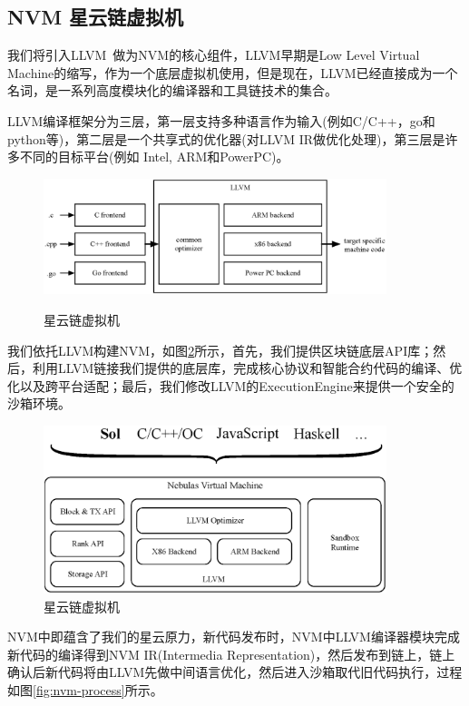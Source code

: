 \subsection{NVM 星云链虚拟机}
\label{sec:nvm}

我们将引入LLVM~\cite{llvm}做为NVM的核心组件，LLVM早期是Low Level Virtual Machine的缩写，作为一个底层虚拟机使用，但是现在，LLVM已经直接成为一个名词，是一系列高度模块化的编译器和工具链技术的集合。

LLVM编译框架分为三层，第一层支持多种语言作为输入(例如C/C++，go和python等)，第二层是一个共享式的优化器(对LLVM IR做优化处理)，第三层是许多不同的目标平台(例如 Intel, ARM和PowerPC)。

\begin{figure}[h]
\centering
\includegraphics[width=10cm]{./figs/llvm}
\label{fig:llvm}
\caption{星云链虚拟机}
\end{figure}

我们依托LLVM构建NVM，如图\ref{fig:nvm}所示，首先，我们提供区块链底层API库；然后，利用LLVM链接我们提供的底层库，完成核心协议和智能合约代码的编译、优化以及跨平台适配；最后，我们修改LLVM的ExecutionEngine来提供一个安全的沙箱环境。

\begin{figure}[h]
\centering
\includegraphics[width=10cm]{./figs/nvm}
\caption{星云链虚拟机}
\label{fig:nvm}
\end{figure}

NVM中即蕴含了我们的星云原力，新代码发布时，NVM中LLVM编译器模块完成新代码的编译得到NVM IR(Intermedia Representation)，然后发布到链上，链上确认后新代码将由LLVM先做中间语言优化，然后进入沙箱取代旧代码执行，过程如图\ref{fig:nvm-process}所示。 \\

